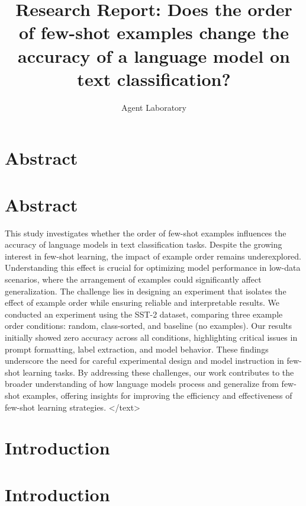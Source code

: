 \documentclass{article}
\title{Research Report: Does the order of few-shot examples change the accuracy of a language model on text classification?}
\author{Agent Laboratory}
\begin{document}
\maketitle
\section{Abstract}
\section*{Abstract}

This study investigates whether the order of few-shot examples influences the accuracy of language models in text classification tasks. Despite the growing interest in few-shot learning, the impact of example order remains underexplored. Understanding this effect is crucial for optimizing model performance in low-data scenarios, where the arrangement of examples could significantly affect generalization. The challenge lies in designing an experiment that isolates the effect of example order while ensuring reliable and interpretable results. We conducted an experiment using the SST-2 dataset, comparing three example order conditions: random, class-sorted, and baseline (no examples). Our results initially showed zero accuracy across all conditions, highlighting critical issues in prompt formatting, label extraction, and model behavior. These findings underscore the need for careful experimental design and model instruction in few-shot learning tasks. By addressing these challenges, our work contributes to the broader understanding of how language models process and generalize from few-shot examples, offering insights for improving the efficiency and effectiveness of few-shot learning strategies.
</text>
\section{Introduction}
\section*{Introduction}
\end{document}
